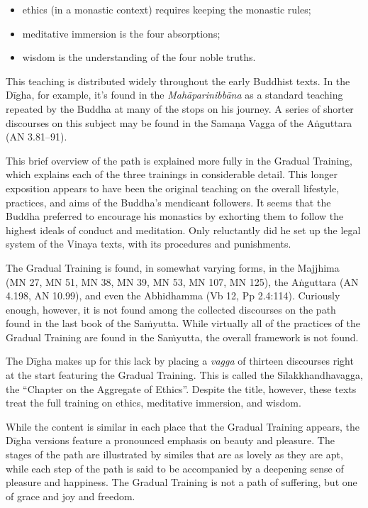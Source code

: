 \documentclass[12pt,openany]{book}%
\begin{document}
\begin{itemize}%
\item ethics (in a monastic context) requires keeping the monastic rules;%
\item meditative immersion is the four absorptions;%
\item wisdom is the understanding of the four noble truths.%
\end{itemize}

This teaching is distributed widely throughout the early Buddhist texts. In the \textsanskrit{Dīgha}, for example, it’s found in the \textit{\textsanskrit{Mahāparinibbāna}} as a standard teaching repeated by the Buddha at many of the stops on his journey. A series of shorter discourses on this subject may be found in the \textsanskrit{Samaṇa} Vagga of the \textsanskrit{Aṅguttara} (AN 3.81–91).

This brief overview of the path is explained more fully in the Gradual Training, which explains each of the three trainings in considerable detail. This longer exposition appears to have been the original teaching on the overall lifestyle, practices, and aims of the Buddha’s mendicant followers. It seems that the Buddha preferred to encourage his monastics by exhorting them to follow the highest ideals of conduct and meditation. Only reluctantly did he set up the legal system of the Vinaya texts, with its procedures and punishments.

The Gradual Training is found, in somewhat varying forms, in the Majjhima (MN 27, MN 51, MN 38, MN 39, MN 53, MN 107, MN 125), the \textsanskrit{Aṅguttara} (AN 4.198, AN 10.99), and even the Abhidhamma (Vb 12, Pp 2.4:114). Curiously enough, however, it is not found among the collected discourses on the path found in the last book of the \textsanskrit{Saṁyutta}. While virtually all of the practices of the Gradual Training are found in the \textsanskrit{Saṁyutta}, the overall framework is not found.

The \textsanskrit{Dīgha} makes up for this lack by placing a \textit{vagga} of thirteen discourses right at the start featuring the Gradual Training. This is called the \textsanskrit{Sīlakkhandhavagga}, the “Chapter on the Aggregate of Ethics”. Despite the title, however, these texts treat the full training on ethics, meditative immersion, and wisdom.

While the content is similar in each place that the Gradual Training appears, the \textsanskrit{Dīgha} versions feature a pronounced emphasis on beauty and pleasure. The stages of the path are illustrated by similes that are as lovely as they are apt, while each step of the path is said to be accompanied by a deepening sense of pleasure and happiness. The Gradual Training is not a path of suffering, but one of grace and joy and freedom.
\end{document}
